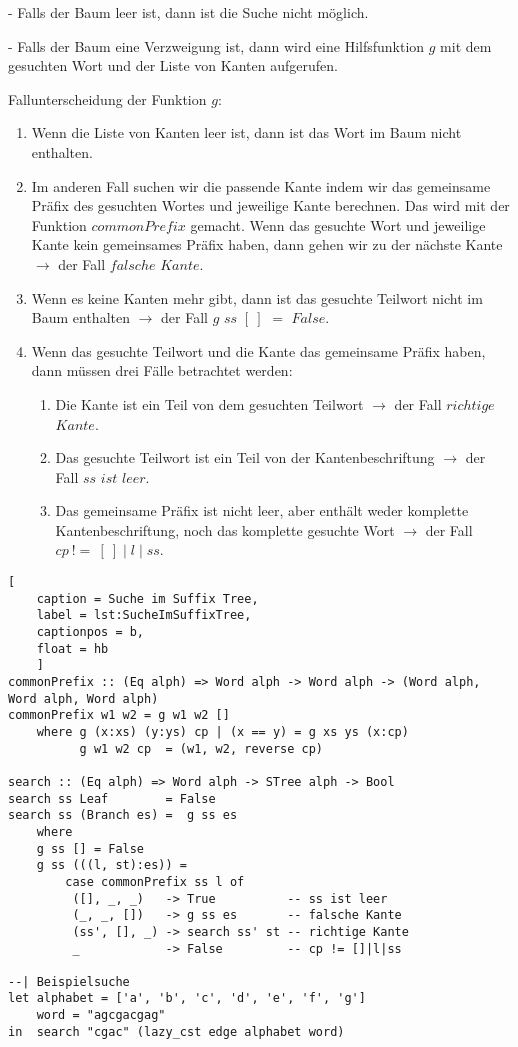 \documentclass[12pt]{report}
\begin{document}
    - Falls der Baum leer ist, dann ist die Suche nicht möglich.

    - Falls der Baum eine Verzweigung ist, dann wird eine Hilfsfunktion $g$ mit dem gesuchten Wort und der Liste von Kanten aufgerufen.

Fallunterscheidung der Funktion $g$:
\begin{enumerate}
    \item Wenn die Liste von Kanten leer ist, dann ist das Wort im Baum nicht enthalten.
    \item Im anderen Fall suchen wir die passende Kante indem wir das gemeinsame Präfix des gesuchten Wortes und jeweilige Kante berechnen. Das wird mit der Funktion $commonPrefix$ gemacht. Wenn das gesuchte Wort und jeweilige Kante kein gemeinsames Präfix haben, dann gehen wir zu der nächste Kante $\rightarrow$ der Fall $falsche$ $Kante$.
    \item Wenn es keine Kanten mehr gibt, dann ist das gesuchte Teilwort nicht im Baum enthalten $\rightarrow$ der Fall $g$ $ss$ $[\:]$ $=$ $False$.
    \item Wenn das gesuchte Teilwort und die Kante das gemeinsame Präfix haben, dann müssen drei Fälle betrachtet werden:
    \begin{enumerate}
        \item Die Kante ist ein Teil von dem gesuchten Teilwort $\rightarrow$ der Fall $richtige$ $Kante$.
        \item Das gesuchte Teilwort ist ein Teil von der Kantenbeschriftung $\rightarrow$ der Fall $ss$ $ist$ $leer$.
        \item Das gemeinsame Präfix ist nicht leer, aber enthält weder komplette Kantenbeschriftung, noch das komplette gesuchte Wort $\rightarrow$ der Fall $cp\:!=\:[\:]\mid l \mid ss$.
    \end{enumerate}
\end{enumerate}

\begin{lstlisting}[
    caption = Suche im Suffix Tree,
    label = lst:SucheImSuffixTree,
    captionpos = b,
    float = hb
    ]
commonPrefix :: (Eq alph) => Word alph -> Word alph -> (Word alph, Word alph, Word alph)
commonPrefix w1 w2 = g w1 w2 []
    where g (x:xs) (y:ys) cp | (x == y) = g xs ys (x:cp)
          g w1 w2 cp  = (w1, w2, reverse cp)

search :: (Eq alph) => Word alph -> STree alph -> Bool
search ss Leaf        = False
search ss (Branch es) =  g ss es
    where
    g ss [] = False
    g ss (((l, st):es)) =
        case commonPrefix ss l of
         ([], _, _)   -> True          -- ss ist leer
         (_, _, [])   -> g ss es       -- falsche Kante
         (ss', [], _) -> search ss' st -- richtige Kante
         _            -> False         -- cp != []|l|ss

--| Beispielsuche
let alphabet = ['a', 'b', 'c', 'd', 'e', 'f', 'g']
    word = "agcgacgag"
in  search "cgac" (lazy_cst edge alphabet word)
\end{lstlisting}
\end{document}
